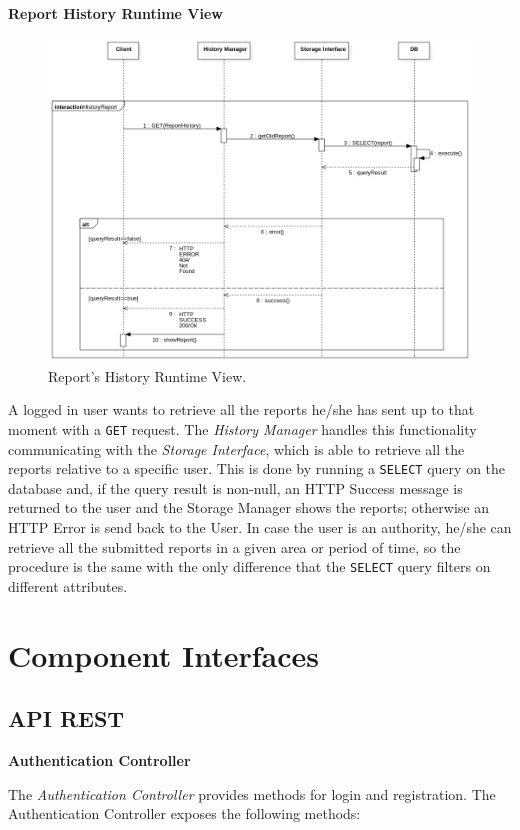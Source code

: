\documentclass{report}
\begin{document}
\begin{center}\large{\textbf{Report History Runtime View}}\end{center}
\begin{figure}[H]
	\begin{center}
	\includegraphics[width=\textwidth]{img/HistoryReport.png}
    \end{center}
    \label{fig:HistoryReportSD}
	\caption{Report's History Runtime View.}
\end{figure}
A logged in user wants to retrieve all the reports he/she has sent up to that moment with a \texttt{GET} request. The \textit{History Manager} handles this functionality communicating with the \textit{Storage Interface}, which is able to retrieve all the reports relative to a specific user. This is done by running a \texttt{SELECT} query on the database and, if the query result is non-null, an HTTP Success message is returned to the user and the Storage Manager shows the reports; otherwise an HTTP Error is send back to the User.
In case the user is an authority, he/she can retrieve all the submitted reports in a given area or period of time, so the procedure is the same with the only difference that the \texttt{SELECT} query filters on different attributes.  
\clearpage
\section{Component Interfaces}
\subsection{API REST}
\begin{center}\large{\textbf{Authentication Controller}}\end{center}
The \textit{Authentication Controller} provides methods for login and registration.
The Authentication Controller exposes the following methods: \\
\end{document}
